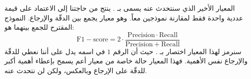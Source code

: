 المعيار الأخير الذي سنتحدث عنه يسمى بـ .
ينتج من حاجتنا إلى الاعتماد على قيمة عددية واحدة فقط لمقارنة نموذجين معاً.
وهو معيار يجمع بين الدقّة والإرجاع.
النموذج المقترح للجمع بينهما هو:
$$ \mathrm{F1-score} = 2 \cdot \frac{ \mathrm{Precision} \cdot \mathrm{Recall}}
{\mathrm{Precision} + \mathrm{Recall}} $$
سنرمز لهذا المعيار اختصار بـ .
حيث أن الرقم $1$ في اسمه يدل على أننا نعطي للدقّة والإرجاع نفس الأهمية.
فهذا المعيار حالة خاصة من معيار أعم يسمح بإعطاء أهمية أكبر للدقّة على الإرجاع وبالعكس، ولكن لن نتحدث عنه.




 